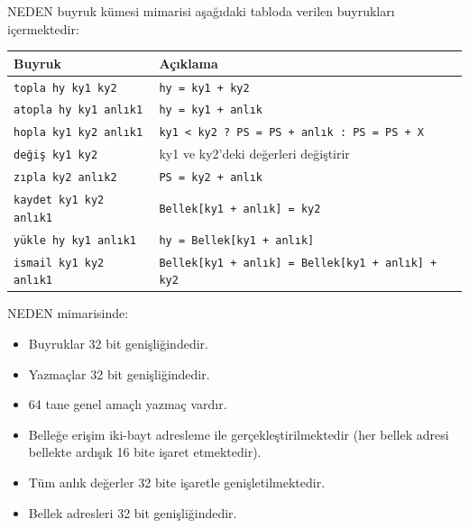 \begin{alistirma}[\zor]
NEDEN buyruk kümesi mimarisi aşağıdaki tabloda verilen buyrukları içermektedir:

\begin{center}
\begin{tabular}{ll}
\toprule
\textbf{Buyruk} & \textbf{Açıklama} \\
\midrule
\texttt{topla hy ky1 ky2} & \texttt{hy = ky1 + ky2} \\
\texttt{atopla hy ky1 anlık1} & \texttt{hy = ky1 + anlık} \\
\texttt{hopla ky1 ky2 anlık1} & \texttt{ky1 < ky2 ? PS = PS + anlık : PS = PS + X} \\
\texttt{değiş ky1 ky2} & ky1 ve ky2'deki değerleri değiştirir \\
\texttt{zıpla ky2 anlık2} & \texttt{PS = ky2 + anlık} \\
\texttt{kaydet ky1 ky2 anlık1} & \texttt{Bellek[ky1 + anlık] = ky2} \\
\texttt{yükle hy ky1 anlık1} & \texttt{hy = Bellek[ky1 + anlık]} \\
\texttt{ismail ky1 ky2 anlık1} & \texttt{Bellek[ky1 + anlık] = Bellek[ky1 + anlık] + ky2} \\
\bottomrule
\end{tabular}
\end{center}

NEDEN mimarisinde:
\begin{itemize}
    \item Buyruklar 32 bit genişliğindedir.
    \item Yazmaçlar 32 bit genişliğindedir.
    \item 64 tane genel amaçlı yazmaç vardır.
    \item Belleğe erişim iki-bayt adresleme ile gerçekleştirilmektedir (her bellek adresi bellekte ardışık 16 bite işaret etmektedir).
    \item Tüm anlık değerler 32 bite işaretle genişletilmektedir.
    \item Bellek adresleri 32 bit genişliğindedir.
\end{itemize}


\end{alistirma}

